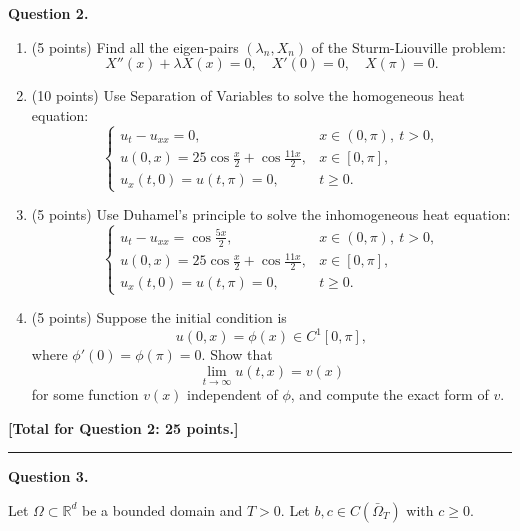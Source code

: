 \documentclass[11pt, a4paper]{article}
\begin{document}
\textbf{Question 2.}
\begin{enumerate}[label=(\alph*)]
    \item (5 points) Find all the eigen-pairs $(\lambda_n, X_n)$ of the Sturm-Liouville problem:
          \[
              X''(x) + \lambda X(x) = 0, \quad X'(0) = 0, \quad X(\pi) = 0.
          \]

    \item (10 points) Use Separation of Variables to solve the homogeneous heat equation:
          \[
              \begin{cases}
                  u_t - u_{xx} = 0,                                   & x \in (0, \pi), \ t > 0, \\
                  u(0, x) = 25 \cos \frac{x}{2} + \cos \frac{11x}{2}, & x \in [0, \pi],          \\
                  u_x(t, 0) = u(t, \pi) = 0,                          & t \ge 0.
              \end{cases}
          \]

    \item (5 points)  Use Duhamel's principle to solve the inhomogeneous heat equation:
          \[
              \begin{cases}
                  u_t - u_{xx} = \cos \frac{5x}{2},                   & x \in (0, \pi), \ t > 0, \\
                  u(0, x) = 25 \cos \frac{x}{2} + \cos \frac{11x}{2}, & x \in [0, \pi],          \\
                  u_x(t, 0) = u(t, \pi) = 0,                          & t \ge 0.
              \end{cases}
          \]

    \item (5 points) Suppose the initial condition is $$u(0, x) = \phi(x) \in C^1[0, \pi],$$ where $\phi'(0) = \phi(\pi) = 0$. Show that
          \[
              \lim_{t \to \infty} u(t, x) = v(x)
          \]
          for some function $v(x)$ independent of $\phi$, and compute the exact form of $v$.
\end{enumerate}
\textbf{[Total for Question 2: 25 points.]}

\noindent \rule[0.5pt]{\textwidth}{0.5pt}

\textbf{Question 3.}

Let $\Omega \subset \mathbb{R}^d$ be a bounded domain and $T > 0$. Let $b, c \in C(\bar{\Omega}_T)$ with $c \ge 0$.
\end{document}
